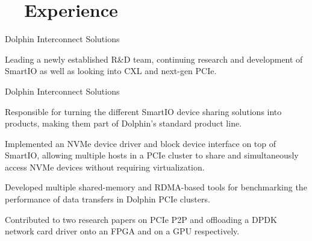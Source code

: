 \section[Experience]{\faBriefcase~~Experience}
\begin{experience}{Dolphin Interconnect Solutions}{%
}
    \item{Leading a newly established R\&D team, continuing research and development of SmartIO as well as looking into CXL and next-gen PCIe.}
\end{experience}

\begin{experience}{Dolphin Interconnect Solutions}{
}
    \item{Responsible for turning the different SmartIO device sharing solutions into products, making them part of Dolphin's standard product line.}
    \item{Implemented an NVMe device driver and block device interface on top of SmartIO, allowing multiple hosts in a PCIe cluster to share and simultaneously access NVMe devices without requiring virtualization.}
    \item{Developed multiple shared-memory and RDMA-based tools for benchmarking the performance of data transfers in Dolphin PCIe clusters.}
    \item{Contributed to two research papers on PCIe P2P and offloading a DPDK network card driver onto an FPGA and on a GPU respectively.}
\end{experience}

